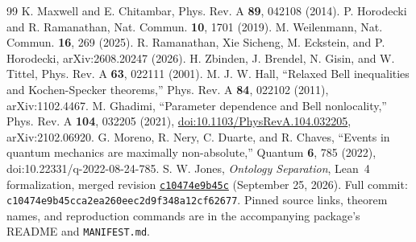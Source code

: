 \documentclass[10pt,twocolumn]{article}
\begin{document}
\begin{thebibliography}{99}
 K. Maxwell and E. Chitambar, Phys. Rev. A \textbf{89}, 042108 (2014).
 P. Horodecki and R. Ramanathan, Nat. Commun. \textbf{10}, 1701 (2019).
 M. Weilenmann, Nat. Commun. \textbf{16}, 269 (2025).
 R. Ramanathan, Xie Sicheng, M. Eckstein, and P. Horodecki, arXiv:2608.20247 (2026).
 H. Zbinden, J. Brendel, N. Gisin, and W. Tittel, Phys. Rev. A \textbf{63}, 022111 (2001).
 M. J. W. Hall, ``Relaxed Bell inequalities and Kochen-Specker theorems,'' Phys. Rev. A \textbf{84}, 022102 (2011), arXiv:1102.4467.
 M. Ghadimi, ``Parameter dependence and Bell nonlocality,'' Phys. Rev. A \textbf{104}, 032205 (2021), \href{https://doi.org/10.1103/PhysRevA.104.032205}{doi:10.1103/PhysRevA.104.032205}, arXiv:2102.06920.
 G. Moreno, R. Nery, C. Duarte, and R. Chaves, ``Events in quantum mechanics are maximally non-absolute,'' Quantum \textbf{6}, 785 (2022), doi:10.22331/q-2022-08-24-785.
 S. W. Jones, \emph{Ontology Separation}, Lean~4
formalization, merged revision
\href{https://github.com/stevenwarejones/ontology-separation/tree/c10474e9b45cca2ea260eec2d9f348a12cf62677}{\texttt{c10474e9b45c}}
(September 25, 2026). Full commit:
\nolinkurl{c10474e9b45cca2ea260eec2d9f348a12cf62677}.
Pinned source links, theorem names, and reproduction commands are in the
accompanying package's README and \texttt{MANIFEST.md}.
\end{thebibliography}
\end{document}
